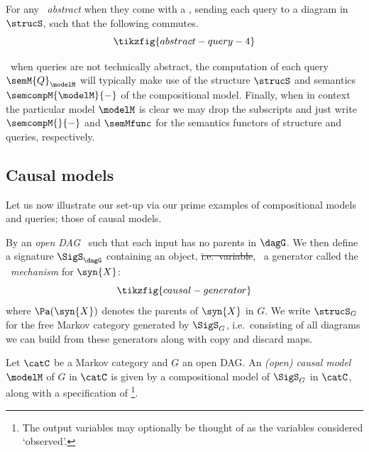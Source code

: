 \documentclass{article}
\begin{document}
\begin{definition} \label{def:abstract-query}
For any \ \emph{abstract} when they come with a , sending each query to a diagram in $\strucS$, such that the following commutes.  
\[
\tikzfig{abstract-query-4}
\] 
\end{definition}

\ 
when queries are not technically abstract, the computation of each query $\semM{Q}_{\modelM}$ will typically make use of the structure $\strucS$ and semantics $\semcompM{\modelM}{-}$ of the compositional model. Finally, when in context the particular model $\modelM$ is clear we may drop the subscripts and just write $\semcompM{}{-}$ and $\semMfunc_{}$ for the semantics functors of structure and queries, respectively.


\subsection{Causal models} \label{subsec:causal-models}

Let us now illustrate our set-up via our prime examples of compositional models and queries; those of causal models. \  

By an \emph{open DAG} \ such that each input has no parents in $\dagG$. We then define a signature $\SigS_\dagG$ containing an object, \st{i.e.~variable}, \ a generator called the \ \emph{mechanism} for $\syn{X}$: 
\[
\tikzfig{causal-generator}
\]
where $\Pa(\syn{X})$ denotes the parents of $\syn{X}$ in $G$. We write $\strucS_G$ for the free Markov category generated by $\SigS_G$, i.e.~consisting of all diagrams we can build from these generators along with copy and discard maps. 


\begin{definition} \label{def:causal-model}
Let $\catC$ be a Markov category and $G$ an open DAG. An \emph{(open) causal model} $\modelM$ of $G$ in $\catC$ is given by a compositional model of $\SigS_G$ in $\catC$, along with a specification of 
\rlb{output variables $\Vout \subseteq \VG$}\footnote{The output variables may optionally be thought of as the variables considered `observed'.}. 
\end{definition}
\end{document}
